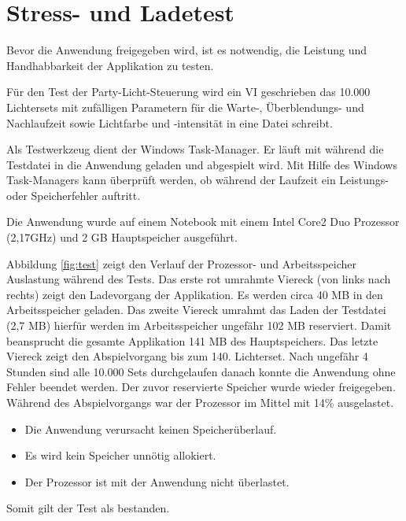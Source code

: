 \section{Stress- und Ladetest}		
Bevor die Anwendung freigegeben wird, ist es notwendig, die Leistung und Handhabbarkeit der Applikation zu testen. 

Für den Test der Party-Licht-Steuerung wird ein VI geschrieben das 10.000 Lichtersets mit zufälligen Parametern für die Warte-, Überblendungs- und Nachlaufzeit sowie Lichtfarbe und -intensität
in eine Datei schreibt. 

Als Testwerkzeug dient der Windows Task-Manager. Er läuft mit während die Testdatei in die Anwendung geladen und abgespielt wird.
Mit Hilfe des Windows Task-Managers kann überprüft werden, ob während der Laufzeit ein Leistungs- oder Speicherfehler auftritt. 

Die Anwendung wurde auf einem Notebook mit einem Intel Core2 Duo Prozessor (2,17GHz) und 2 GB Hauptspeicher ausgeführt. 

Abbildung \ref{fig:test} zeigt den Verlauf der Prozessor- und Arbeitsspeicher Auslastung während des Tests. 
Das erste rot umrahmte Viereck (von links nach rechts) zeigt den Ladevorgang der Applikation. Es werden circa 40 MB in den Arbeitsspeicher geladen. 
Das zweite Viereck umrahmt das Laden der Testdatei (2,7 MB) hierfür werden im Arbeitsspeicher ungefähr 102 MB reserviert. 
Damit beansprucht die gesamte Applikation 141 MB des Hauptspeichers. 
Das letzte Viereck zeigt  den Abspielvorgang bis zum 140. Lichterset. 
Nach ungefähr 4 Stunden sind alle 10.000 Sets durchgelaufen danach konnte die Anwendung ohne Fehler beendet werden.
Der zuvor reservierte Speicher wurde wieder freigegeben. 
Während des Abspielvorgangs war der Prozessor im Mittel mit 14\% ausgelastet.


\begin{itemize}
\item Die Anwendung verursacht keinen Speicherüberlauf.
\item Es wird kein Speicher unnötig allokiert.
\item Der Prozessor ist mit der Anwendung nicht überlastet.
\end{itemize}
 Somit gilt der Test als bestanden. 

